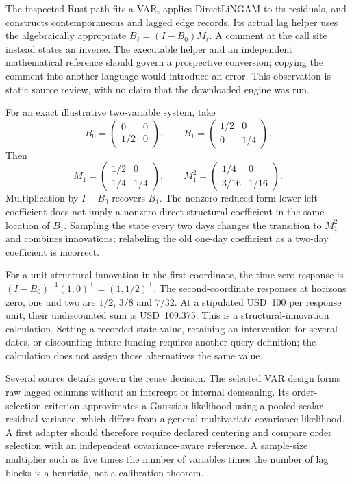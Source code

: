 The inspected Rust path fits a VAR, applies DirectLiNGAM to its residuals,
and constructs contemporaneous and lagged edge records. Its actual lag helper
uses the algebraically appropriate $B_\ell=(I-B_0)M_\ell$.
A comment at the call site instead states an inverse. The executable helper
and an independent mathematical reference should govern a prospective
conversion; copying the comment into another language would introduce an
error. This observation is static source review, with no claim that the
downloaded engine was run.
\citep{exec17_temporal_varlingam}

For an exact illustrative two-variable system, take
\[
 B_0=\begin{pmatrix}0&0\\1/2&0\end{pmatrix},\qquad
 B_1=\begin{pmatrix}1/2&0\\0&1/4\end{pmatrix}.
\]
Then
\[
 M_1=\begin{pmatrix}1/2&0\\1/4&1/4\end{pmatrix},\qquad
 M_1^2=\begin{pmatrix}1/4&0\\3/16&1/16\end{pmatrix}.
\]
Multiplication by $I-B_0$ recovers $B_1$. The nonzero reduced-form
lower-left coefficient does not imply a nonzero direct structural coefficient
in the same location of $B_1$. Sampling the state every two days changes
the transition to $M_1^2$ and combines innovations; relabeling the old
one-day coefficient as a two-day coefficient is incorrect.
\citep{exec17_temporal_oracle}

For a unit structural innovation in the first coordinate, the time-zero
response is $(I-B_0)^{-1}(1,0)^\top=(1,1/2)^\top$.
The second-coordinate responses at horizons zero, one and two are
$1/2$, $3/8$ and $7/32$. At a stipulated USD~100 per response unit, their
undiscounted sum is USD~109.375. This is a structural-innovation calculation.
Setting a recorded state value, retaining an intervention for several dates,
or discounting future funding requires another query definition; the
calculation does not assign those alternatives the same value.
\citep{exec17_temporal_oracle}

Several source details govern the reuse decision. The selected VAR design
forms raw lagged columns without an intercept or internal demeaning.
Its order-selection criterion approximates a Gaussian likelihood using a
pooled scalar residual variance, which differs from a general multivariate
covariance likelihood. A first adapter should therefore require declared
centering and compare order selection with an independent covariance-aware
reference. A sample-size multiplier such as five times the number of variables
times the number of lag blocks is a heuristic, not a calibration theorem.
\citep{exec17_temporal_varlingam}

